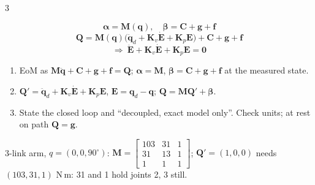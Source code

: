 \begin{multicols}{3}
\begin{fbx}
\[\boldsymbol\alpha=\mathbf M(\mathbf q),\quad \boldsymbol\beta=\mathbf C+\mathbf g+\mathbf f\]
\[\mathbf Q=\mathbf M(\mathbf q)\big(\ddot{\mathbf q}_d+\mathbf K_v\dot{\mathbf E}+\mathbf K_p\mathbf E\big)+\mathbf C+\mathbf g+\mathbf f\]
\[\Rightarrow\ \ddot{\mathbf E}+\mathbf K_v\dot{\mathbf E}+\mathbf K_p\mathbf E=\mathbf 0\]
\end{fbx}
\begin{recipe}
\label{w9:ct}
\begin{enumerate}
\item EoM as $\mathbf M\ddot{\mathbf q}+\mathbf C+\mathbf g+\mathbf f=\mathbf Q$; $\boldsymbol\alpha=\mathbf M$, $\boldsymbol\beta=\mathbf C+\mathbf g+\mathbf f$ at the measured state.
\item $\mathbf Q'=\ddot{\mathbf q}_d+\mathbf K_v\dot{\mathbf E}+\mathbf K_p\mathbf E$, $\mathbf E=\mathbf q_d-\mathbf q$; $\mathbf Q=\mathbf M\mathbf Q'+\boldsymbol\beta$.
\item State the closed loop and ``decoupled, exact model only''. Check units; at rest on path $\mathbf Q=\mathbf g$.
\end{enumerate}
\end{recipe}
\begin{worked}
3-link arm, $q=(0,0,90^\circ)$: $\mathbf M=\begin{bmatrix}103&31&1\\31&13&1\\1&1&1\end{bmatrix}$; $\mathbf Q'=(1,0,0)$ needs $(103,31,1)$ N\,m: 31 and 1 hold joints 2, 3 still. \chk
\end{worked}


\end{multicols}
